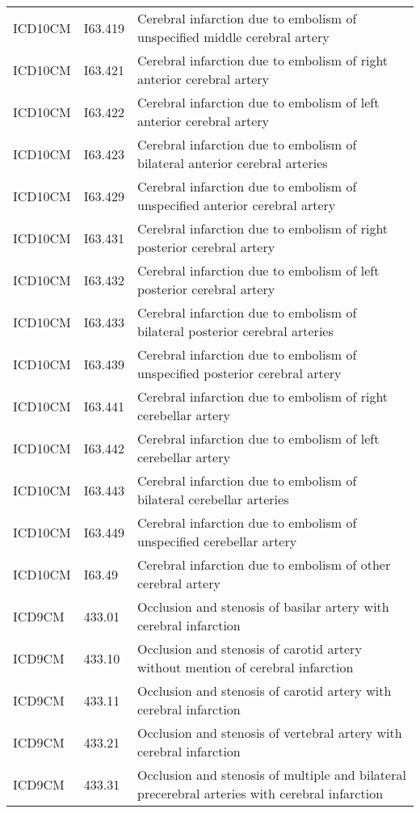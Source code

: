 \begin{longtable}{p{}p{}p{}}
  ICD10CM & I63.419 & Cerebral infarction due to embolism of unspecified middle cerebral artery \\ 
  ICD10CM & I63.421 & Cerebral infarction due to embolism of right anterior cerebral artery \\ 
  ICD10CM & I63.422 & Cerebral infarction due to embolism of left anterior cerebral artery \\ 
  ICD10CM & I63.423 & Cerebral infarction due to embolism of bilateral anterior cerebral arteries \\ 
  ICD10CM & I63.429 & Cerebral infarction due to embolism of unspecified anterior cerebral artery \\ 
  ICD10CM & I63.431 & Cerebral infarction due to embolism of right posterior cerebral artery \\ 
  ICD10CM & I63.432 & Cerebral infarction due to embolism of left posterior cerebral artery \\ 
  ICD10CM & I63.433 & Cerebral infarction due to embolism of bilateral posterior cerebral arteries \\ 
  ICD10CM & I63.439 & Cerebral infarction due to embolism of unspecified posterior cerebral artery \\ 
  ICD10CM & I63.441 & Cerebral infarction due to embolism of right cerebellar artery \\ 
  ICD10CM & I63.442 & Cerebral infarction due to embolism of left cerebellar artery \\ 
  ICD10CM & I63.443 & Cerebral infarction due to embolism of bilateral cerebellar arteries \\ 
  ICD10CM & I63.449 & Cerebral infarction due to embolism of unspecified cerebellar artery \\ 
  ICD10CM & I63.49 & Cerebral infarction due to embolism of other cerebral artery \\ 
  ICD9CM & 433.01 & Occlusion and stenosis of basilar artery with cerebral infarction \\ 
  ICD9CM & 433.10 & Occlusion and stenosis of carotid artery without mention of cerebral infarction \\ 
  ICD9CM & 433.11 & Occlusion and stenosis of carotid artery with cerebral infarction \\ 
  ICD9CM & 433.21 & Occlusion and stenosis of vertebral artery with cerebral infarction \\ 
  ICD9CM & 433.31 & Occlusion and stenosis of multiple and bilateral precerebral arteries with cerebral infarction \\ 

\end{longtable}
